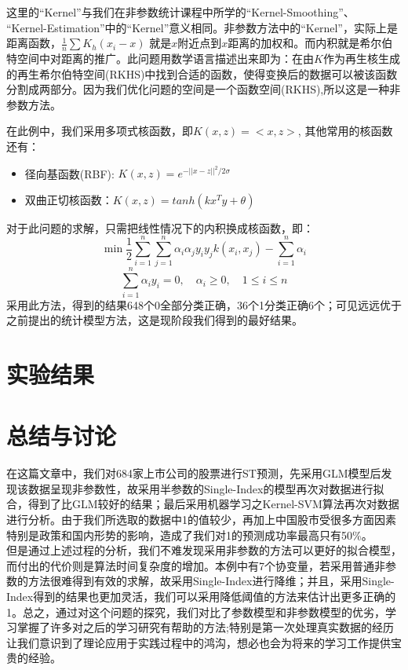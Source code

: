 \documentclass[a4paper,UTF8]{article}
\begin{document}
这里的“Kernel”与我们在非参数统计课程中所学的“Kernel-Smoothing”、\\“Kernel-Estimation”中的“Kernel”意义相同。非参数方法中的“Kernel”，实际上是距离函数，$\frac{1}{n}\sum K_{h}(x_{i}-x)$ 就是$x$附近点到$x$距离的加权和。而内积就是希尔伯特空间中对距离的推广。此问题用数学语言描述出来即为：在由$K$作为再生核生成的再生希尔伯特空间(RKHS)中找到合适的函数，使得变换后的数据可以被该函数分割成两部分。因为我们优化问题的空间是一个函数空间(RKHS),所以这是一种非参数方法。

在此例中，我们采用多项式核函数，即$K(x,z)=<x,z> $, 其他常用的核函数还有：
\begin{itemize}
	\item 径向基函数(RBF): $K(x,z)=e^{-||x-z||^{2}/2\sigma} $
	\item 双曲正切核函数：$K(x,z)=tanh(kx^{T}y+\theta) $
\end{itemize}

对于此问题的求解，只需把线性情况下的内积换成核函数，即：
$$\min \frac{1}{2}  \sum_{i=1}^{n}\sum_{j=1}^{n} \alpha_{i}\alpha_{j}y_{i}y_{j}k(x_{i},x_{j}) - \sum_{i=1}^{n}\alpha_{i}$$
$$\sum_{i=1}^{n}\alpha_{i}y_{i}=0,\quad \alpha_{i} \geq 0,\quad 1\leq i \leq n $$
采用此方法，得到的结果648个0全部分类正确，36个1分类正确6个；可见远远优于之前提出的统计模型方法，这是现阶段我们得到的最好结果。

\section{实验结果}

\section{总结与讨论}
在这篇文章中，我们对684家上市公司的股票进行ST预测，先采用GLM模型后发现该数据呈现非参数性，故采用半参数的Single-Index的模型再次对数据进行拟合，得到了比GLM较好的结果；最后采用机器学习之Kernel-SVM算法再次对数据进行分析。由于我们所选取的数据中1的值较少，再加上中国股市受很多方面因素特别是政策和国内形势的影响，造成了我们对1的预测成功率最高只有50\%。\\

但是通过上述过程的分析，我们不难发现采用非参数的方法可以更好的拟合模型，而付出的代价则是算法时间复杂度的增加。本例中有7个协变量，若采用普通非参数的方法很难得到有效的求解，故采用Single-Index进行降维；并且，采用Single-Index得到的结果也更加灵活，我们可以采用降低阈值的方法来估计出更多正确的1。总之，通过对这个问题的探究，我们对比了参数模型和非参数模型的优劣，学习掌握了许多对之后的学习研究有帮助的方法;特别是第一次处理真实数据的经历让我们意识到了理论应用于实践过程中的鸿沟，想必也会为将来的学习工作提供宝贵的经验。
\cite{kipf2016semi}


\nocite{*}   %


\end{document}
